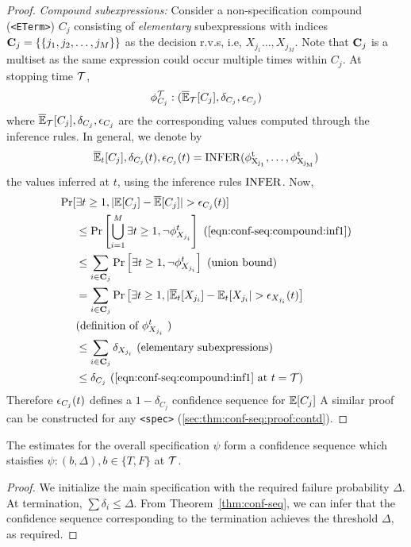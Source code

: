 \begin{proof}
\noindent \textit{Compound subexpressions:} 
Consider a non-specification compound (\texttt{<ETerm>}) $C_j$ consisting of \textit{elementary} subexpressions with indices ${\mathbf{C}}_j = \{\{j_1, j_2, \dots, j_{M}\}\}$ as the decision r.v.s, i.e, $X_{j_1} \dots, X_{j_{M}}$.
Note that ${\mathbf{C}}_j$ is a multiset as the same expression could occur multiple times within $C_j$. 
At stopping time ${\mathcal{T}}$, 
\begin{equation}
    \phi_{C_j}^{\mathcal{T}}: (\overline{\mathbb{E}}_{\mathcal{T}}[C_j], \delta_{C_j}, {\epsilon}_{C_j})
\end{equation}
where $\overline{\mathbb{E}}_{\mathcal{T}}[C_j], \delta_{C_j}, {\epsilon}_{C_j}$ are the corresponding values computed through the inference rules.
In general, we denote by 
\begin{equation}
\overline{\mathbb{E}}_t[C_j], \delta_{C_j}(t), {\epsilon}_{C_j}(t) = \rm{INFER}(\phi^t_{X_{j_1}}, \dots, \phi^t_{X_{j_M}})
\label{eqn:conf-seq:compound:inf1}
\end{equation}
the values inferred at $t$, using the inference rules $\rm{INFER}$. 
Now,
\begin{align*}
    \Pr[&\exists t \geq 1, |\E[C_j] - \BarE[C_j]| > \eps_{C_j}(t)]\\
        &\leq \Pr\left[\bigcup\limits_{i = 1}^{M} \exists t \geq 1,  \neg \phi_{X_{j_i}}^t \right]  \text{ (\cref{eqn:conf-seq:compound:inf1})} \\
      &\leq \sum\limits_{i\in \rmC_j}\Pr\left[\exists t \geq 1, \neg \phi^t_{X_{j_i}}\right]  \text{ (union bound)} \\
      &= \sum\limits_{i\in \rmC_j}\Pr\left[\exists t \geq 1, |\BarE_t[X_{j_i}] - \E_t[X_{j_i}| > \epsilon_{X_{j_i}}(t)\right] \\
      &\text{(definition of $\phi^t_{X_{j_i}}$ )} \\
      &\leq \sum\limits_{i\in \rmC_j} \delta_{X_{j_i}}  \text{ (elementary subexpressions)} \\
      &\leq \delta_{C_j} \text{ (\cref{eqn:conf-seq:compound:inf1} at $t = \gT$)}
\end{align*}
Therefore ${\epsilon}_{C_j}(t)$ defines a $1 - \delta_{C_j}$ confidence sequence for $\mathbb{E}[C_j]$
A similar proof can be constructed for any \texttt{<spec>} (\cref{sec:thm:conf-seq:proof:contd}).
\end{proof}

\begin{corollary}
The estimates for the overall specification $\psi$ form a confidence sequence which staisfies $\psi: (b, \Delta), b \in \{T, F\}$ at ${\mathcal{T}}$.
\end{corollary}
\begin{proof}
We initialize the main specification with the required failure probability $\Delta$. 
At termination, $\sum \delta_i \leq \Delta$.
From Theorem~\ref{thm:conf-seq}, we can infer that the confidence sequence corresponding to the termination achieves the threshold $\Delta$, as required.
\end{proof}


